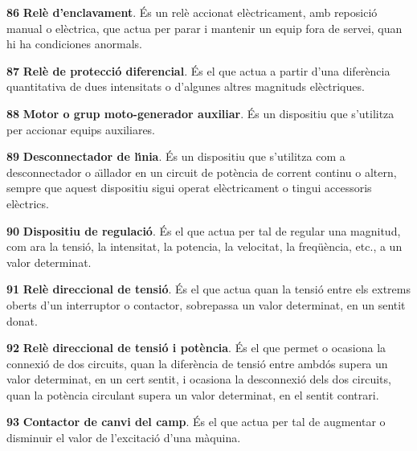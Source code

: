 \begin{multicols}{2}
\begin{list}{}
\item[\textbf{86}]  \textbf{Rel\`{e} d'enclavament}. \'{E}s un rel\`{e}
accionat el\`{e}ctricament, amb reposici\'{o} manual o el\`{e}ctrica, que actua
per parar i mantenir un equip fora de servei, quan hi ha condiciones
anormals.

\item[\textbf{87}]  \textbf{Rel\`{e} de protecci\'{o}
diferencial}. \'{E}s el que actua a partir d'una  difer\`{e}ncia quantitativa de dues intensitats
o d'algunes altres magnituds el\`{e}ctriques.

\item[\textbf{88}]  \textbf{Motor o grup
moto-generador auxiliar}. \'{E}s un dispositiu que s'utilitza per
accionar equips auxiliares.

\item[\textbf{89}]  \textbf{Desconnectador de l\'{\i}nia}. \'{E}s
un dispositiu que s'utilitza com a desconnectador o a\"{\i}llador en un
circuit de pot\`{e}ncia de corrent continu o altern, sempre que aquest
dispositiu sigui operat el\`{e}ctricament o tingui accessoris el\`{e}ctrics.

\item[\textbf{90}]  \textbf{Dispositiu de regulaci\'{o}}. \'{E}s el que
actua per tal de regular una magnitud, com ara la tensi\'{o}, la intensitat, la potencia,
la velocitat, la freq\"{u}\`{e}ncia, etc., a un valor determinat.

\item[\textbf{91}]  \textbf{Rel\`{e} direccional de tensi\'{o}}.
\'{E}s el que actua quan la tensi\'{o} entre els extrems oberts d'un
interruptor o contactor, sobrepassa un valor determinat, en un
sentit donat.

\item[\textbf{92}]  \textbf{Rel\`{e} direccional
de tensi\'{o} i pot\`{e}ncia}. \'{E}s el que permet o ocasiona la connexi\'{o} de
dos circuits, quan la difer\`{e}ncia de tensi\'{o} entre ambd\'{o}s supera un
valor determinat, en un cert sentit, i ocasiona la desconnexi\'{o} dels
dos circuits, quan la pot\`{e}ncia circulant supera un valor determinat,
en el sentit contrari.

\item[\textbf{93}]  \textbf{Contactor de canvi del camp}. \'{E}s el
que actua per tal de augmentar o disminuir el valor de l'excitaci\'{o}
d'una m\`{a}quina.


\end{list}
\end{multicols}
